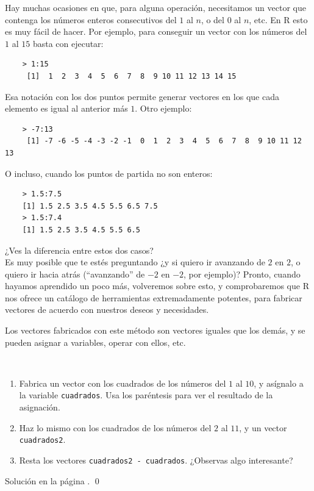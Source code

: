 \documentclass[10pt,a4paper]{article}\usepackage[]{graphicx}\usepackage[]{color}
\newcounter {cont01}
\begin{document}
Hay muchas ocasiones en que, para alguna operación, necesitamos un vector que contenga los números enteros consecutivos del $1$ al $n$, o del $0$ al $n$, etc. En R esto es muy fácil de hacer. Por ejemplo, para conseguir un vector con los números del $1$ al $15$ basta con ejecutar:
    \begin{verbatim}
    > 1:15
     [1]  1  2  3  4  5  6  7  8  9 10 11 12 13 14 15
    \end{verbatim}
Esa notación con los dos puntos permite generar vectores en los que cada elemento es igual al anterior más $1$. Otro ejemplo:
    \begin{verbatim}
    > -7:13
     [1] -7 -6 -5 -4 -3 -2 -1  0  1  2  3  4  5  6  7  8  9 10 11 12 13
    \end{verbatim}
O incluso, cuando los puntos de partida no son enteros:
    \begin{verbatim}
    > 1.5:7.5
    [1] 1.5 2.5 3.5 4.5 5.5 6.5 7.5
    > 1.5:7.4
    [1] 1.5 2.5 3.5 4.5 5.5 6.5
    \end{verbatim}
¿Ves la diferencia entre estos dos casos?\\

Es muy posible que te estés preguntando ¿y si quiero ir avanzando de $2$ en $2$, o quiero ir hacia atrás (``avanzando'' de $-2$ en $-2$, por ejemplo)? Pronto, cuando hayamos aprendido un poco más, volveremos sobre esto, y comprobaremos que R nos ofrece un catálogo de herramientas extremadamente potentes, para fabricar vectores de acuerdo con nuestros deseos y necesidades.

Los vectores fabricados con este método son vectores iguales que los demás, y se pueden asignar a variables, operar con ellos, etc.

\begin{ejercicio}
\label{tut02:ejercicio07}
\quad\\
\begin{enumerate}
  \item Fabrica un vector con los cuadrados de los números del $1$ al $10$, y asígnalo a la variable {\tt cuadrados}. Usa los paréntesis para ver el resultado de la asignación.
  \item Haz lo mismo con los cuadrados de los números del $2$ al $11$, y un vector {\tt cuadrados2}.
  \item Resta los vectores {\tt cuadrados2 - cuadrados}. ¿Observas algo interesante?
\end{enumerate}
Solución en la página \pageref{tut02:ejercicio07:sol}. \qed
\end{ejercicio}
\end{document}
